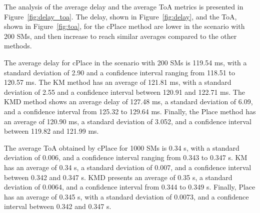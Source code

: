 \documentclass[a4paper,fleqn]{cas-dc}
\begin{document}
The analysis of the average delay and the average \gls{ToA} metrics is presented in Figure~\ref{fig:delay_toa}. The delay, shown in Figure~\ref{fig:delay}, and the \gls{ToA}, shown in Figure~\ref{fig:toa}, for the cPlace method are lower in the scenario with 200 \gls{SMs}, and then increase to reach similar averages compared to the other methods.

The average delay for cPlace in the scenario with 200 \gls{SMs} is 119.54 ms, with a standard deviation of 2.90 and a confidence interval ranging from 118.51 to 120.57 ms. The KM method has an average of 121.81 ms, with a standard deviation of 2.55 and a confidence interval between 120.91 and 122.71 ms. The KMD method shows an average delay of 127.48 ms, a standard deviation of 6.09, and a confidence interval from 125.32 to 129.64 ms. Finally, the Place method has an average of 120.90 ms, a standard deviation of 3.052, and a confidence interval between 119.82 and 121.99 ms.

The average \gls{ToA} obtained by cPlace for 1000 \gls{SMs} is 0.34 s, with a standard deviation of 0.006, and a confidence interval ranging from 0.343 to 0.347 s. KM has an average of 0.34 s, a standard deviation of 0.007, and a confidence interval between 0.342 and 0.347 s. KMD presents an average of 0.35 s, a standard deviation of 0.0064, and a confidence interval from 0.344 to 0.349 s. Finally, Place has an average of 0.345 s, with a standard deviation of 0.0073, and a confidence interval between 0.342 and 0.347 s.
\end{document}
